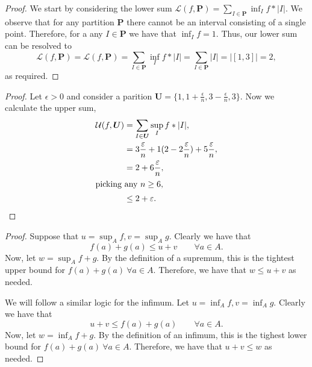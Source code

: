 \documentclass[twoside]{article}
\begin{document}
    \begin{proof}
        We start by considering the lower sum $\mathcal{L}(f, \bm{P}) = \sum_{I \in \bm{P}} \inf_{I} f * |I|$.
        We observe that for any partition $\bm{P}$ there cannot be an interval consisting
        of a single point. Therefore, for a any $I \in \bm{P}$ we have that
        $\inf_{I} f = 1$. Thus, our lower sum can be resolved to
        \begin{equation*}
            \mathcal{L}(f, \bm{P}) = \mathcal{L}(f, \bm{P}) = \sum_{I \in \bm{P}} \inf_{I} f * |I|
            = \sum_{I \in \bm{P}} |I| = |[1, 3]| = 2,
        \end{equation*}
        as required.
    \end{proof}

    \begin{proof}
        Let $\epsilon > 0$ and consider a parition $\bm{U} = \{1, 1 + \frac{\epsilon}{n}, 3 - \frac{\epsilon}{n}, 3\}$.
        Now we calculate the upper sum,
        \begin{align*}
            \mathcal{U}(f, \bm{U}) &= \sum_{I \in \bm{U}} \sup_{I} f * |I|,\\
                                   &= 3\frac{\varepsilon}{n} + 1(2 - 2\frac{\varepsilon}{n}) + 5\frac{\varepsilon}{n},\\ 
                                   &= 2 + 6\frac{\varepsilon}{n},\\ 
                                   \intertext{picking any $n \geq 6$,}
                                   &\leq 2 + \varepsilon.
        \end{align*}
    \end{proof}

    \begin{proof}
        Suppose that $u = \sup_{A} f, v = \sup_{A} g$. Clearly we have that
        \begin{equation*}
            f(a) + g(a) \leq u + v \qquad \forall a \in A.
        \end{equation*}
        Now, let $w = \sup_{A} f + g$. By the definition of a supremum, this is the
        tightest upper bound for $f(a) + g(a) \ \forall a \in A$. 
        Therefore, we have that $w \leq u + v$ as needed.

        We will follow a similar logic for the infimum.
        Let $u = \inf_{A} f, v = \inf_{A} g$. Clearly we have that
        \begin{equation*}
            u + v \leq f(a) + g(a) \qquad  \forall a \in A.
        \end{equation*}
        Now, let $w = \inf_{A} f + g$. By the definition of an infimum, this is
        the tighest lower bound for $f(a) + g(a) \ \forall a \in A$.
        Therefore, we have that $u + v \leq w$ as needed.
    \end{proof}
\end{document}
